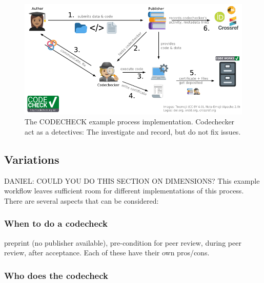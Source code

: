 \documentclass[12pt]{article}
\begin{document}
\begin{figure}
  \centering
      \includegraphics{figs/codecheck_overview.pdf}
  \caption{The CODECHECK example process implementation. Codechecker act as a detectives:
  The investigate and record, but do not fix issues.}
  \label{fig:worfklow}
\end{figure}

\subsection*{Variations}\label{variations}

DANIEL: COULD YOU DO THIS SECTION ON DIMENSIONS?
This example workflow leaves sufficient room for different
implementations of this process. There are several aspects that can be
considered:

\subsubsection*{When to do a codecheck}\label{when-to-do-a-codecheck}

preprint (no publisher available), pre-condition for peer review, during
peer review, after acceptance. Each of these have their own pros/cons.

\subsubsection*{Who does the codecheck}\label{who-does-the-codecheck}
\end{document}
